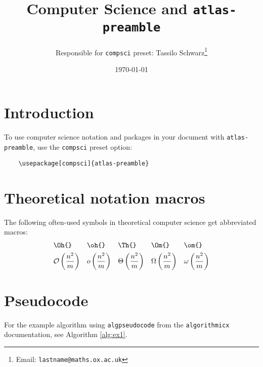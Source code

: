 \documentclass[11pt, a4paper]{article}
\title{Computer Science and \texttt{atlas-preamble}}
\author{Responsible for \texttt{compsci} preset: Tassilo Schwarz\footnote{Email: \texttt{lastname@maths.ox.ac.uk}}}
\date{\today}
\begin{document}
\maketitle


\section{Introduction}
To use computer science notation and packages in your document with \texttt{atlas-preamble}, use the \texttt{compsci} preset option:
\begin{verbatim}
	\usepackage[compsci]{atlas-preamble}
\end{verbatim}


\section{Theoretical notation macros}
The following often-used symbols in theoretical computer science get abbreviated macros:
\begin{align*}
	&\texttt{\textbackslash Oh\{\}} & &\texttt{\textbackslash oh\{\}} & &\texttt{\textbackslash Th\{\}} & &\texttt{\textbackslash Om\{\}} & &\texttt{\textbackslash om\{\}} \\
	&\mathcal{O}\left(\frac{n^2}{m}\right) & &o\left(\frac{n^2}{m}\right) & &\Theta\left(\frac{n^2}{m}\right) & &\Omega\left(\frac{n^2}{m}\right) & &\omega\left(\frac{n^2}{m}\right)
\end{align*}


\section{Pseudocode}
For the example algorithm using \texttt{algpseudocode} from the \texttt{algorithmicx} documentation, see Algorithm \ref{alg:ex1}.
\end{document}

